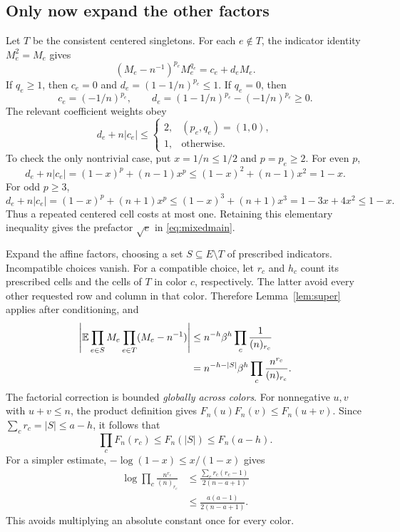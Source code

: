 \subsection{Only now expand the other factors}

Let $T$ be the consistent centered singletons. For each $e\notin T$, the indicator identity $M_e^2=M_e$ gives
\[
(M_e-n^{-1})^{p_e}M_e^{q_e}=c_e+d_eM_e.
\]
If $q_e\ge1$, then $c_e=0$ and $d_e=(1-1/n)^{p_e}\le1$. If $q_e=0$, then
\[
c_e=(-1/n)^{p_e},\qquad d_e=(1-1/n)^{p_e}-(-1/n)^{p_e}\ge0.
\]
The relevant coefficient weights obey
\begin{equation}\label{eq:weights}
d_e+n|c_e|\le
\begin{cases}
2,& (p_e,q_e)=(1,0),\\
1,& \text{otherwise}.
\end{cases}
\end{equation}
To check the only nontrivial case, put $x=1/n\le1/2$ and $p=p_e\ge2$. For even $p$,
\[
d_e+n|c_e|=(1-x)^p+(n-1)x^p
\le(1-x)^2+(n-1)x^2=1-x.
\]
For odd $p\ge3$,
\[
d_e+n|c_e|=(1-x)^p+(n+1)x^p
\le(1-x)^3+(n+1)x^3=1-3x+4x^2\le1-x.
\]
Thus a repeated centered cell costs at most one. Retaining this elementary inequality gives the prefactor $\sqrt e$ in \eqref{eq:mixedmain}.

Expand the affine factors, choosing a set $S\subseteq E\setminus T$ of prescribed indicators. Incompatible choices vanish. For a compatible choice, let $r_c$ and $h_c$ count its prescribed cells and the cells of $T$ in color $c$, respectively. The latter avoid every other requested row and column in that color. Therefore Lemma~\ref{lem:super} applies after conditioning, and
\begin{align}
\left|\mathbb E\prod_{e\in S}M_e\prod_{e\in T}(M_e-n^{-1})\right|
&\le n^{-h}\beta^h\prod_c\frac1{(n)_{r_c}}\notag\\
&=n^{-h-|S|}\beta^h\prod_c\frac{n^{r_c}}{(n)_{r_c}}.\label{eq:prescribed}
\end{align}
The factorial correction is bounded \emph{globally across colors}. For nonnegative $u,v$ with $u+v\le n$, the product definition gives $F_n(u)F_n(v)\le F_n(u+v)$. Since $\sum_c r_c=|S|\le a-h$, it follows that
\[
\prod_c F_n(r_c)\le F_n(|S|)\le F_n(a-h).
\]
For a simpler estimate, $-\log(1-x)\le x/(1-x)$ gives
\begin{align*}
\log\prod_c\frac{n^{r_c}}{(n)_{r_c}}
&\le\frac{\sum_c r_c(r_c-1)}{2(n-a+1)}\\
&\le\frac{a(a-1)}{2(n-a+1)}.
\end{align*}
This avoids multiplying an absolute constant once for every color.

